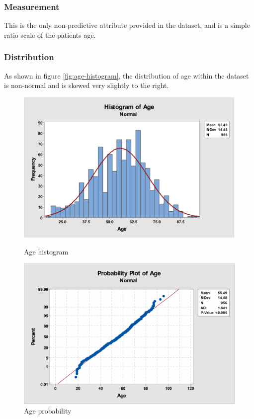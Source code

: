 \documentclass[12pt]{article}
\begin{document}
      \subsubsection{Measurement}
        This is the only non-predictive attribute provided in the dataset, and is a simple ratio scale of the patients age.

      \subsubsection{Distribution}
        As shown in figure \ref{fig:age-histogram}, the distribution of age within the dataset is non-normal and is skewed very slightly to the right.

        \begin{figure}[H]
          \centering
          \begin{minipage}[b]{0.45\textwidth}
            \includegraphics[width=\textwidth]{age-histogram}
            \caption{Age histogram}
            \label{fig:age-histogram}
          \end{minipage}
          \hfill
          \begin{minipage}[b]{0.45\textwidth}
            \includegraphics[width=\textwidth]{age-probability}
            \caption{Age probability}
            \label{fig:age-probability}
          \end{minipage}
        \end{figure}
\end{document}
